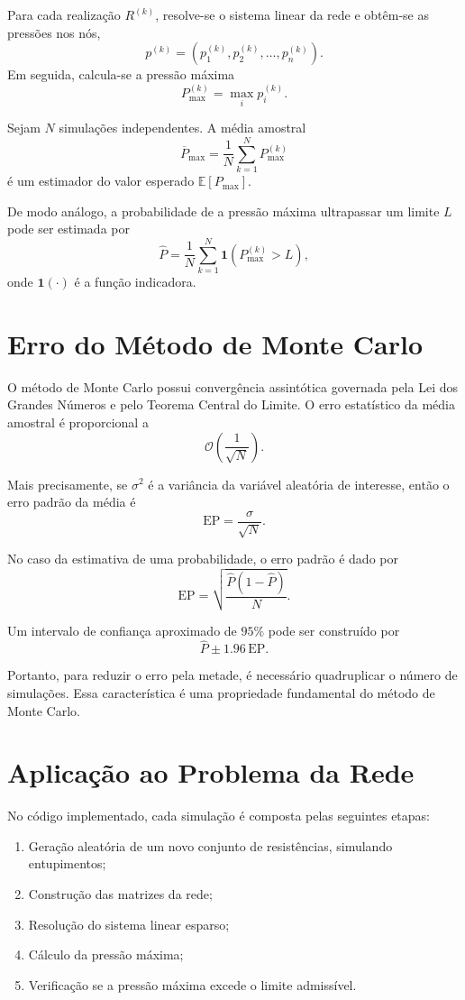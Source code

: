 \documentclass{article}
\begin{document}
Para cada realização \(R^{(k)}\), resolve-se o sistema linear da rede e obtêm-se as pressões nos nós,
\[
p^{(k)} = \left(p_1^{(k)}, p_2^{(k)}, \dots, p_n^{(k)}\right).
\]
Em seguida, calcula-se a pressão máxima
\[
P_{\max}^{(k)} = \max_i p_i^{(k)}.
\]

Sejam \(N\) simulações independentes. A média amostral
\[
\overline{P}_{\max}
=
\frac{1}{N}
\sum_{k=1}^{N}
P_{\max}^{(k)}
\]
é um estimador do valor esperado \(\mathbb{E}[P_{\max}]\).

De modo análogo, a probabilidade de a pressão máxima ultrapassar um limite \(L\) pode ser estimada por
\[
\widehat{P}
=
\frac{1}{N}
\sum_{k=1}^{N}
\mathbf{1}\!\left(P_{\max}^{(k)} > L\right),
\]
onde \(\mathbf{1}(\cdot)\) é a função indicadora.

\section{Erro do Método de Monte Carlo}

O método de Monte Carlo possui convergência assintótica governada pela Lei dos Grandes Números e pelo Teorema Central do Limite. O erro estatístico da média amostral é proporcional a
\[
\mathcal{O}\!\left(\frac{1}{\sqrt{N}}\right).
\]

Mais precisamente, se \(\sigma^2\) é a variância da variável aleatória de interesse, então o erro padrão da média é
\[
\text{EP}
=
\frac{\sigma}{\sqrt{N}}.
\]

No caso da estimativa de uma probabilidade, o erro padrão é dado por
\[
\text{EP}
=
\sqrt{
\frac{\widehat{P}(1-\widehat{P})}{N}
}.
\]

Um intervalo de confiança aproximado de \(95\%\) pode ser construído por
\[
\widehat{P}
\pm
1.96\,\text{EP}.
\]

Portanto, para reduzir o erro pela metade, é necessário quadruplicar o número de simulações. Essa característica é uma propriedade fundamental do método de Monte Carlo.

\section{Aplicação ao Problema da Rede}

No código implementado, cada simulação é composta pelas seguintes etapas:

\begin{enumerate}
    \item Geração aleatória de um novo conjunto de resistências, simulando entupimentos;
    \item Construção das matrizes da rede;
    \item Resolução do sistema linear esparso;
    \item Cálculo da pressão máxima;
    \item Verificação se a pressão máxima excede o limite admissível.
\end{enumerate}
\end{document}
